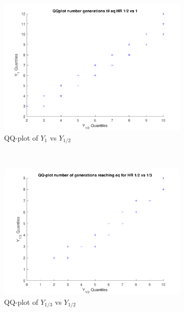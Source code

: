 \begin{figure}[H]
    \centering
    \begin{subfigure}{0.45\textwidth}
    \includegraphics[width=\textwidth]{QQplotATGEN3-klein.pdf}
    \caption{QQ-plot of $Y_{1}$ vs $Y_{1/2}$}
        \label{fig:QQplotATGEN3}
    \end{subfigure}
    ~
    \begin{subfigure}{0.45\textwidth}
    \includegraphics[width=\textwidth]{QQplotATGEN1-klein.pdf}
    \caption{QQ-plot of $Y_{1/3}$ vs $Y_{1/2}$}
        \label{fig:QQplotATGEN1}
    \end{subfigure}
    ~
    \begin{subfigure}{0.45\textwidth}

\end{subfigure}
\end{figure}
